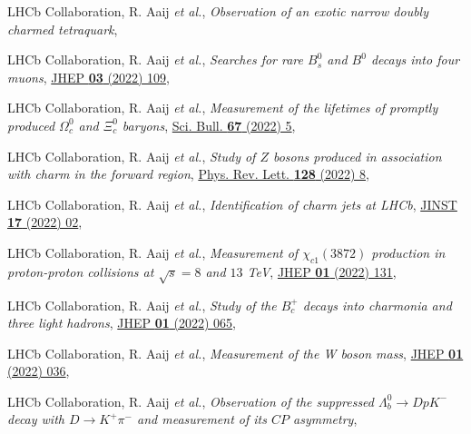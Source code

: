 \begin{cvcontent}
\begin{enumerate}[label={[\arabic*]}, leftmargin=1.5cm]
    \item LHCb Collaboration, R. Aaij \emph{et al.}, 
    \emph{Observation of an exotic narrow doubly charmed tetraquark}, 
  \end{enumerate}
  \begin{enumerate}[label={[\arabic*]}, leftmargin=1.5cm]
    \item LHCb Collaboration, R. Aaij \emph{et al.}, 
    \emph{Searches for rare $B_s^0$ and $B^0$ decays into four muons},
    \href{https://doi.org/10.1007/JHEP03(2022)109}{JHEP \textbf{03} (2022) 109},
    \item LHCb Collaboration, R. Aaij \emph{et al.}, 
    \emph{Measurement of the lifetimes of promptly produced $\Omega^{0}_{c}$ and $\Xi^{0}_{c}$ baryons},
    \href{https://doi.org/10.1016/j.scib.2021.11.022}{Sci. Bull. \textbf{67} (2022) 5},
    \item LHCb Collaboration, R. Aaij \emph{et al.}, 
    \emph{Study of $Z$ bosons produced in association with charm in the forward region},
    \href{https://journals.aps.org/prl/abstract/10.1103/PhysRevLett.128.082001#}{Phys. Rev. Lett. \textbf{128} (2022) 8},
    \item LHCb Collaboration, R. Aaij \emph{et al.}, 
    \emph{Identification of charm jets at LHCb},
    \href{https://doi.org/10.1088/1748-0221/17/02/p02028}{JINST \textbf{17} (2022) 02},
    \item LHCb Collaboration, R. Aaij \emph{et al.}, 
    \emph{Measurement of $\chi_{c1}(3872)$ production in proton-proton collisions at $\sqrt{s}=8$ and $13$ TeV},
    \href{https://doi.org/10.1007/JHEP01(2022)131}{JHEP \textbf{01} (2022) 131},
    \item LHCb Collaboration, R. Aaij \emph{et al.}, 
    \emph{Study of the $B_c^+$ decays into charmonia and three light hadrons},
    \href{https://doi.org/10.1007/JHEP01(2022)065}{JHEP \textbf{01} (2022) 065},
    \item LHCb Collaboration, R. Aaij \emph{et al.}, 
    \emph{Measurement of the W boson mass}, 
    \href{https://doi.org/10.1007/JHEP01(2022)036}{JHEP \textbf{01} (2022) 036},
    \item LHCb Collaboration, R. Aaij \emph{et al.}, 
    \emph{Observation of the suppressed $\Lambda_b^0\to D p K^-$ decay with $D\to K^+ \pi^-$ and measurement of its $C\!P$ asymmetry}, 

\end{enumerate}
\end{cvcontent}
